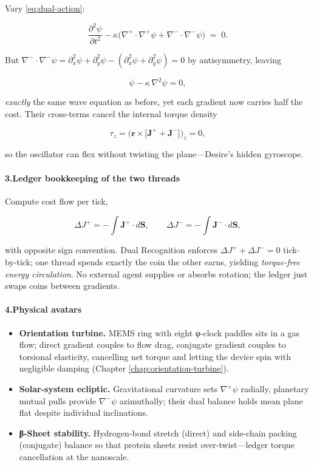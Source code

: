 \documentclass[11pt,oneside]{book}
\begin{document}
Vary \eqref{eq:dual-action}:

\[
  \frac{\partial^{2}\psi}{\partial t^{2}}
  - \kappa\bigl(\nabla^{\!+}\!\cdot\nabla^{\!+}\psi
               +\nabla^{\!-}\!\cdot\nabla^{\!-}\psi\bigr)
  \;=\; 0.
\]

But $\nabla^{\!-}\!\cdot\nabla^{\!-}\psi
       = \partial_{x}^{2}\psi+\partial_{y}^{2}\psi
       - (\partial_{x}^{2}\psi+\partial_{y}^{2}\psi)=0$  
by antisymmetry, leaving

\[
  \ddot\psi - \kappa\,\nabla^{2}\psi = 0,
\]

\emph{exactly} the same wave equation as before, yet each gradient now
carries half the cost.  Their cross-terms cancel the internal torque
density

\[
  \tau_z = \bigl(\mathbf r\times
                \bigl[\mathbf J^{\!+}+\mathbf J^{\!-}\bigr]\bigr)_z
         = 0 ,
\]

so the oscillator can flex without twisting the plane—Desire’s hidden
gyroscope.

\paragraph*{3.\;Ledger bookkeeping of the two threads}

Compute cost flow per tick,

\[
  \Delta J^{\!+} = -\int\!\mathbf J^{\!+}\!\cdot d\mathbf S,
  \qquad
  \Delta J^{\!-} = -\int\!\mathbf J^{\!-}\!\cdot d\mathbf S,
\]

with opposite sign convention.  
Dual Recognition enforces
$\Delta J^{\!+} + \Delta J^{\!-}=0$ tick-by-tick;  
one thread spends exactly the coin the other earns, yielding
\emph{torque-free energy circulation}.  No external agent supplies or
absorbs rotation; the ledger just swaps coins between gradients.

\paragraph*{4.\;Physical avatars}

\begin{itemize}
\item \textbf{Orientation turbine.}  
  MEMS ring with eight φ-clock paddles sits in a gas flow; direct
  gradient couples to flow drag, conjugate gradient couples to torsional
  elasticity, cancelling net torque and letting the device spin with
  negligible damping (Chapter \ref{chap:orientation-turbine}).
\item \textbf{Solar-system ecliptic.}  
  Gravitational curvature sets $\nabla^{\!+}\psi$ radially, planetary
  mutual pulls provide $\nabla^{\!-}\psi$ azimuthally; their dual
  balance holds mean plane flat despite individual inclinations.
\item \textbf{β-Sheet stability.}  
  Hydrogen-bond stretch (direct) and side-chain packing (conjugate)
  balance so that protein sheets resist over-twist—ledger torque
  cancellation at the nanoscale.
\end{itemize}
\end{document}
